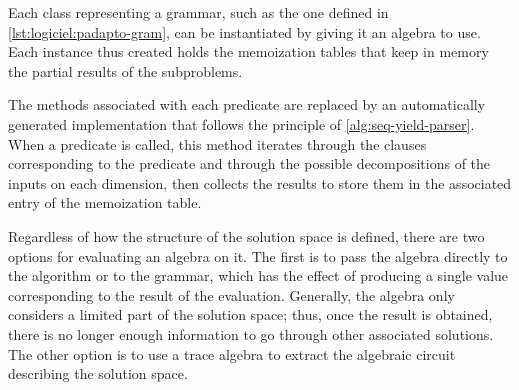 Each class representing a grammar, such as the one defined in \cref{lst:logiciel:padapto-gram}, can be instantiated by giving it an algebra to use.
Each instance thus created holds the memoization tables that keep in memory the partial results of the subproblems.

The methods associated with each predicate are replaced by an automatically generated implementation that follows the principle of \cref{alg:seq-yield-parser}.
When a predicate is called, this method iterates through the clauses corresponding to the predicate and through the possible decompositions of the inputs on each dimension, then collects the results to store them in the associated entry of the memoization table.

Regardless of how the structure of the solution space is defined, there are two options for evaluating an algebra on it.
The first is to pass the algebra directly to the algorithm or to the grammar, which has the effect of producing a single value corresponding to the result of the evaluation.
Generally, the algebra only considers a limited part of the solution space; thus, once the result is obtained, there is no longer enough information to go through other associated solutions.
The other option is to use a trace algebra to extract the algebraic circuit describing the solution space.
